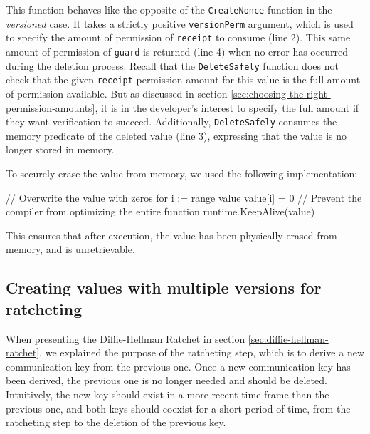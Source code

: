 This function behaves like the opposite of the \texttt{CreateNonce} function in the \emph{versioned} case.
It takes a strictly positive \texttt{versionPerm} argument, which is used to specify the amount of permission of \texttt{receipt} to consume (line 2).
This same amount of permission of \texttt{guard} is returned (line 4) when no error has occurred during the deletion process.
Recall that the \texttt{DeleteSafely} function does not check that the given \texttt{receipt} permission amount for this value is the full amount of permission available.
But as discussed in section \ref{sec:choosing-the-right-permission-amounts}, it is in the developer's interest to specify the full amount if they want verification to succeed.
Additionally, \texttt{DeleteSafely} consumes the memory predicate of the deleted value (line 3), expressing that the value is no longer stored in memory.

To securely erase the value from memory, we used the following implementation:
\begin{gobra}
// Overwrite the value with zeros
for i := range value {
    value[i] = 0
}
// Prevent the compiler from optimizing the entire function
runtime.KeepAlive(value)
\end{gobra}
This ensures that after execution, the value has been physically erased from memory, and is unretrievable.

\subsection{Creating values with multiple versions for ratcheting}
\label{sec:creating-values-with-multiple-versions-for-ratcheting}

When presenting the Diffie-Hellman Ratchet in section \ref{sec:diffie-hellman-ratchet}, we explained the purpose of the ratcheting step, which is to derive a new communication key from the previous one. Once a new communication key has been derived, the previous one is no longer needed and should be deleted.
Intuitively, the new key should exist in a more recent time frame than the previous one, and both keys should coexist for a short period of time, from the ratcheting step to the deletion of the previous key.

